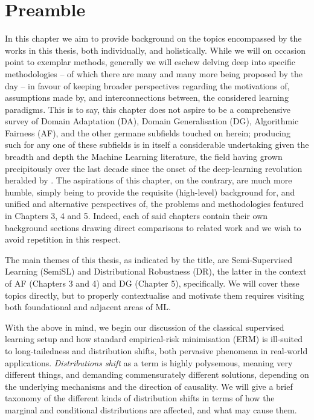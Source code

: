 \section{Preamble}
\noindent
%
In this chapter we aim to provide background on the topics encompassed by the works in this thesis,
both individually, and holistically.
%
While we will on occasion point to exemplar methods, generally we will eschew delving deep into
specific methodologies -- of which there are many and many more being proposed by the day -- in
favour of keeping broader perspectives regarding the motivations of, assumptions made by, and
interconnections between, the considered learning paradigms. 
%
This is to say, this chapter does not aspire to be a comprehensive survey of Domain Adaptation
(DA), Domain Generalisation (DG), Algorithmic Fairness (AF), and the other germane subfields
touched on herein; producing such for any one of these subfields is in itself a considerable
undertaking given the breadth and depth the Machine Learning literature, the field having grown
precipitously over the last decade since the onset of the deep-learning revolution heralded by
\cite{Krizhevsky2012imagenet}.
%
The aspirations of this chapter, on the contrary, are much more humble, simply being to provide the
requisite (high-level) background for, and unified and alternative perspectives of, the problems
and methodologies featured in Chapters 3, 4 and 5.
%
Indeed, each of said chapters contain their own background sections drawing direct comparisons to
related work and we wish to avoid repetition in this respect.

The main themes of this thesis, as indicated by the title, are Semi-Supervised Learning (SemiSL)
and Distributional Robustness (DR), the latter in the context of AF (Chapters 3 and 4) and DG
(Chapter 5), specifically. 
%
We will cover these topics directly, but to properly contextualise and motivate them requires
visiting both foundational and adjacent areas of ML.

%
With the above in mind, we begin our discussion of the classical supervised learning setup and how
standard empirical-risk minimisation (ERM) is ill-suited to long-tailedness and distribution shifts,
both pervasive phenomena in real-world applications. \emph{Distributions shift} as a term is highly
polysemous, meaning very different things, and demanding commensurately different solutions,
depending on the underlying mechanisms and the direction of causality. We will give a brief
taxonomy of the different kinds of distribution shifts in terms of how the marginal and conditional
distributions are affected, and what may cause them. 

